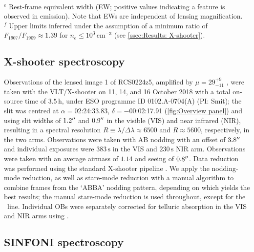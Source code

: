 \begin{table}
    \\
    $^e$ Rest-frame equivalent width (EW; positive values indicating a feature is observed in emission). Note that EWs are independent of lensing magnification.
    \\
    $^f$ Upper limits inferred under the assumption of a minimum ratio of $F_{1907}/F_{1909} \approx 1.39$ for $n_e \leq 10^3 \, \mathrm{cm^{-3}}$ (see \cref{ssec:Results: X-shooter}).
    \label{tab:Results}
\end{table}

\subsection{X-shooter spectroscopy}
\label{ssec:Observations: X-shooter}

Observations of the lensed image 1 of RCS0224z5, amplified by $\mu = 29_{-11}^{+9}$ \citep[luminosity-weighted; see][]{2017MNRAS.467.3306S}, were taken with the VLT/X-shooter \citep{2011A&A...536A.105V} on 11, 14, and 16 October 2018 with a total on-source time of $3.5 \, \mathrm{h}$, under ESO programme ID 0102.A-0704(A) (PI: Smit); the slit was centred at $\alpha = 02$:24:33.83, $\delta = -00$:02:17.91 (\cref{fig:Overview panel}) and using slit widths of $1.2 \hbox{$^{\prime\prime}$}$ and $0.9 \hbox{$^{\prime\prime}$}$ in the visible (VIS) and near infrared (NIR), resulting in a spectral resolution $R \equiv \lambda/\Delta \lambda \approx 6500$ and $R \approx 5600$, respectively, in the two arms. Observations were taken with AB nodding with an offset of $3.8 \hbox{$^{\prime\prime}$}$ and individual exposures were $383 \, \mathrm{s}$ in the VIS and $230 \, \mathrm{s}$ NIR arm. Observations were taken with an average airmass of $1.14$ and seeing of $0.8 \hbox{$^{\prime\prime}$}$. Data reduction was performed using the standard  X-shooter pipeline \citep{2013A&A...559A..96F}. We apply the nodding-mode reduction, as well as stare-mode reduction with a manual algorithm to combine frames from the `ABBA' nodding pattern, depending on which yields the best results; the manual stare-mode reduction is used throughout, except for the \CIV\ line. Individual OBs were separately corrected for telluric absorption in the VIS and NIR arms using  \citep{2015A&A...576A..77S, 2015A&A...576A..78K}.

\subsection{SINFONI spectroscopy}
\label{ssec:Observations: SINFONI}

